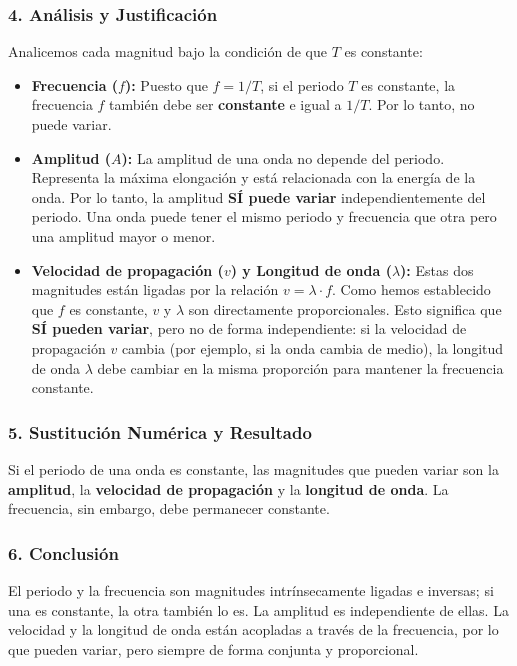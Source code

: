 \subsubsection*{4. Análisis y Justificación}
Analicemos cada magnitud bajo la condición de que $T$ es constante:
\begin{itemize}
    \item \textbf{Frecuencia ($f$):} Puesto que $f = 1/T$, si el periodo $T$ es constante, la frecuencia $f$ también debe ser \textbf{constante} e igual a $1/T$. Por lo tanto, no puede variar.
    \item \textbf{Amplitud ($A$):} La amplitud de una onda no depende del periodo. Representa la máxima elongación y está relacionada con la energía de la onda. Por lo tanto, la amplitud \textbf{SÍ puede variar} independientemente del periodo. Una onda puede tener el mismo periodo y frecuencia que otra pero una amplitud mayor o menor.
    \item \textbf{Velocidad de propagación ($v$) y Longitud de onda ($\lambda$):} Estas dos magnitudes están ligadas por la relación $v = \lambda \cdot f$. Como hemos establecido que $f$ es constante, $v$ y $\lambda$ son directamente proporcionales. Esto significa que \textbf{SÍ pueden variar}, pero no de forma independiente: si la velocidad de propagación $v$ cambia (por ejemplo, si la onda cambia de medio), la longitud de onda $\lambda$ debe cambiar en la misma proporción para mantener la frecuencia constante.
\end{itemize}

\subsubsection*{5. Sustitución Numérica y Resultado}
\begin{cajaresultado}
Si el periodo de una onda es constante, las magnitudes que pueden variar son la \textbf{amplitud}, la \textbf{velocidad de propagación} y la \textbf{longitud de onda}. La frecuencia, sin embargo, debe permanecer constante.
\end{cajaresultado}

\subsubsection*{6. Conclusión}
\begin{cajaconclusion}
El periodo y la frecuencia son magnitudes intrínsecamente ligadas e inversas; si una es constante, la otra también lo es. La amplitud es independiente de ellas. La velocidad y la longitud de onda están acopladas a través de la frecuencia, por lo que pueden variar, pero siempre de forma conjunta y proporcional.
\end{cajaconclusion}

